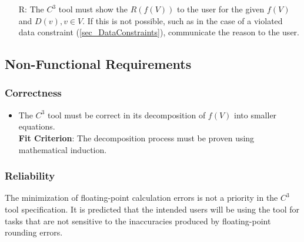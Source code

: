 \documentclass[12pt]{article}
\newcounter{reqnum} %
\newcommand{\prognameAbbrv}{$C^{3}$}
\begin{document}
\begin{itemize}
\item[R\refstepcounter{reqnum}\thereqnum \label{R_Output}:] The 
\prognameAbbrv{} tool must show the $R(f(V))$ to the user for the given $f(V)$ 
and $D(v), v \in V$. If this is not possible, such as in the case of a violated 
data constraint (\ref{sec_DataConstraints}), communicate the reason to the 
user.


\end{itemize}

\subsection{Non-Functional Requirements}

\subsubsection*{Correctness}
\begin{itemize}
	\item The \prognameAbbrv{} tool must be correct in its decomposition of 
	$f(V)$ into smaller equations.\\ \textbf{Fit Criterion}: The decomposition 
	process must be proven using mathematical induction.
\end{itemize}

\subsubsection*{Reliability}
The minimization of floating-point calculation errors is not a priority in the 
\prognameAbbrv{} tool specification. It is predicted that the intended users 
will be using the tool for tasks that are not sensitive to the inaccuracies 
produced by floating-point rounding errors.
\end{document}
